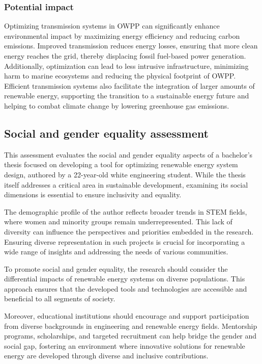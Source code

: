 \documentclass[a4paper,11pt, titlepage, twoside]{article}
\begin{document}
\subsubsection{Potential impact}

Optimizing transmission systems in OWPP can significantly enhance environmental impact by maximizing energy efficiency
and reducing carbon emissions. Improved transmission reduces energy losses, ensuring that more clean energy reaches the grid, thereby displacing fossil
fuel-based power generation. Additionally, optimization can lead to less intrusive infrastructure, minimizing harm to marine ecosystems and reducing the physical footprint of OWPP.
Efficient transmission systems also facilitate the integration of larger amounts of renewable energy, supporting the transition to a sustainable energy future and helping to combat climate change by lowering
greenhouse gas emissions.









\subsection{Social and gender equality assessment}

This assessment evaluates the social and gender equality aspects of a bachelor's thesis focused on developing a tool for optimizing renewable energy system design, authored by a 22-year-old white engineering student. While the thesis itself addresses a critical area in sustainable development, examining its social dimensions is essential to ensure inclusivity and equality.

The demographic profile of the author reflects broader trends in STEM fields, where women and minority groups remain underrepresented. This lack of diversity can influence the perspectives and priorities embedded in the research. Ensuring diverse representation in such projects is crucial for incorporating a wide range of insights and addressing the needs of various communities.

To promote social and gender equality, the research should consider the differential impacts of renewable energy systems on diverse populations. This approach ensures that the developed tools and technologies are accessible and beneficial to all segments of society.

Moreover, educational institutions should encourage and support participation from diverse backgrounds in engineering and renewable energy fields. Mentorship programs, scholarships, and targeted recruitment can help bridge the gender and social gap, fostering an environment where innovative solutions for renewable energy are developed through diverse and inclusive contributions.
\end{document}
